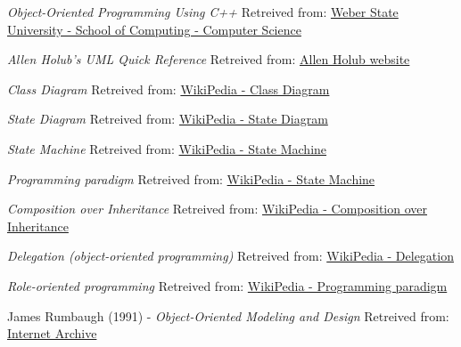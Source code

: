      \emph{Object-Oriented Programming Using C++}
    \newline
    Retreived from: \href{https://icarus.cs.weber.edu/~dab/cs1410/textbook/}{Weber State University - School of Computing - Computer Science}

     \emph{Allen Holub's UML Quick Reference}
    \newline
    Retreived from: \href{https://holub.com/uml/}{Allen Holub website}

     \emph{Class Diagram}
    \newline
    Retreived from: \href{https://en.wikipedia.org/wiki/Class_diagram}{WikiPedia - Class Diagram}
    
     \emph{State Diagram}
    \newline
    Retreived from: \href{https://en.wikipedia.org/wiki/State_diagram}{WikiPedia - State Diagram}
    
     \emph{State Machine}
    \newline
    Retreived from: \href{https://en.wikipedia.org/wiki/Class_diagram}{WikiPedia - State Machine}

     \emph{Programming paradigm}
    \newline
    Retreived from: \href{https://en.wikipedia.org/wiki/Programming_paradigm}{WikiPedia - State Machine}
    
     \emph{Composition over Inheritance}
    \newline
    Retreived from: \href{https://en.wikipedia.org/wiki/Composition_over_inheritance}{WikiPedia - Composition over Inheritance}
    
     \emph{Delegation (object-oriented programming)}
    \newline
    Retreived from: \href{https://en.wikipedia.org/wiki/Delegation_(object-oriented_programming)}{WikiPedia - Delegation}
    
     \emph{Role-oriented programming}
    \newline
    Retreived from: \href{https://en.wikipedia.org/wiki/Programming_paradigm}{WikiPedia - Programming paradigm}
    
    James Rumbaugh (1991) - \emph{Object-Oriented Modeling and Design}
    \newline
    Retreived from: \href{https://archive.org/details/objectorientedmo00rumb}{Internet Archive}


